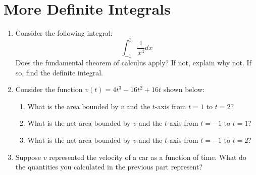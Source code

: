 \documentclass[10pt]{article}
\begin{document}
 \section{More Definite Integrals}
   \begin{enumerate}
    \item Consider the following integral:
    \[\int_{-1}^3\frac{1}{x^4}dx\]
    Does the fundamental theorem of calculus apply? If not, explain why not. If so, find the definite integral.\\\vfill
    \item Consider the function $v(t) = 4t^3-16t^2+16t$ shown below:
    \begin{center}
    \end{center}

    \begin{enumerate}
        \item[a)] What is the area bounded by $v$ and the $t$-axis from $t = 1$ to $t = 2$?\vfill
        \item[b)] What is the net area bounded by $v$ and the $t$-axis from $t = -1$ to $t = 1$?\vfill
        \item[c)] What is the net area bounded by $v$ and the $t$-axis from $t = -1$ to $t = 2$?\vfill
    \end{enumerate}

    \item Suppose $v$ represented the velocity of a car as a function of time. What do the quantities you calculated in the previous part represent?\vfill
    
\end{enumerate}
\end{document}
